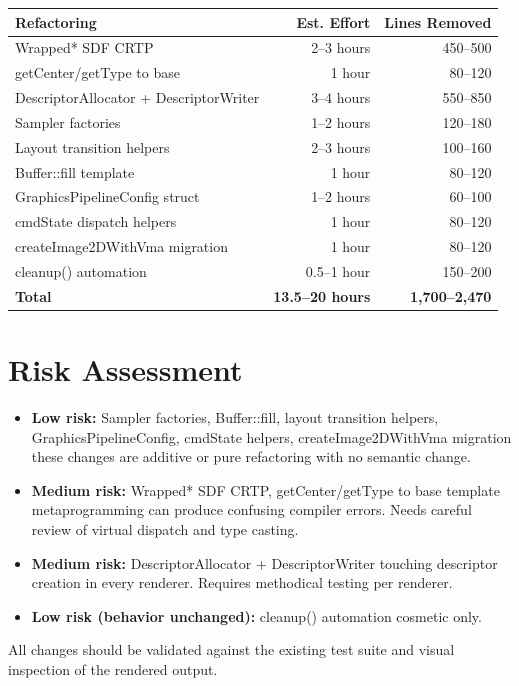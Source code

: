 \documentclass[11pt,a4paper]{article}
\begin{document}
\begin{center}
\begin{tabular}{lrr}
\toprule
Refactoring & Est. Effort & Lines Removed \\
\midrule
Wrapped* SDF CRTP & 2--3 hours & 450--500 \\
getCenter/getType to base & 1 hour & 80--120 \\
DescriptorAllocator + DescriptorWriter & 3--4 hours & 550--850 \\
Sampler factories & 1--2 hours & 120--180 \\
Layout transition helpers & 2--3 hours & 100--160 \\
Buffer::fill template & 1 hour & 80--120 \\
GraphicsPipelineConfig struct & 1--2 hours & 60--100 \\
cmdState dispatch helpers & 1 hour & 80--120 \\
createImage2DWithVma migration & 1 hour & 80--120 \\
cleanup() automation & 0.5--1 hour & 150--200 \\
\midrule
\textbf{Total} & \textbf{13.5--20 hours} & \textbf{1,700--2,470} \\
\bottomrule
\end{tabular}
\end{center}

\section{Risk Assessment}

\begin{itemize}
    \item \textbf{Low risk:} Sampler factories, Buffer::fill, layout transition helpers, GraphicsPipelineConfig, cmdState helpers, createImage2DWithVma migration \textemdash{} these changes are additive or pure refactoring with no semantic change.
    \item \textbf{Medium risk:} Wrapped* SDF CRTP, getCenter/getType to base \textemdash{} template metaprogramming can produce confusing compiler errors. Needs careful review of virtual dispatch and type casting.
    \item \textbf{Medium risk:} DescriptorAllocator + DescriptorWriter \textemdash{} touching descriptor creation in every renderer. Requires methodical testing per renderer.
    \item \textbf{Low risk (behavior unchanged):} cleanup() automation \textemdash{} cosmetic only.
\end{itemize}

All changes should be validated against the existing test suite and visual inspection of the rendered output.
\end{document}
